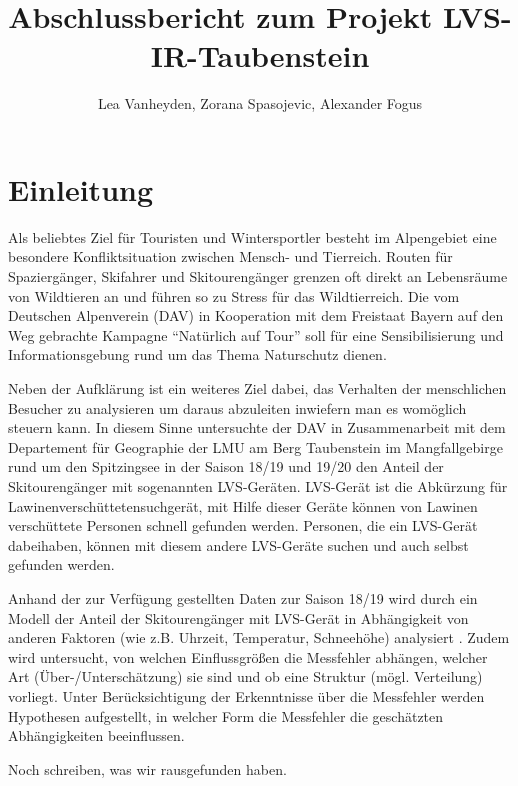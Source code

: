\documentclass[11pt,a4paper]{report}
\title{Abschlussbericht zum Projekt LVS-IR-Taubenstein}
\author{Lea Vanheyden, Zorana Spasojevic, Alexander Fogus}
\begin{document}
	
\maketitle
	
\tableofcontents

\listoffigures

\listoftables

\newpage

\chapter{Einleitung}

Als beliebtes Ziel für Touristen und Wintersportler besteht im Alpengebiet eine besondere Konfliktsituation zwischen Mensch- und Tierreich. Routen für Spaziergänger, Skifahrer und Skitourengänger grenzen oft direkt an Lebensräume von Wildtieren an und führen so zu Stress für das Wildtierreich. Die vom Deutschen Alpenverein (DAV) in Kooperation mit dem Freistaat Bayern auf den Weg gebrachte Kampagne "`Natürlich auf Tour"' soll für eine Sensibilisierung und Informationsgebung rund um das Thema Naturschutz dienen.

Neben der Aufklärung ist ein weiteres Ziel dabei, das Verhalten der menschlichen Besucher zu analysieren um daraus abzuleiten inwiefern man es womöglich steuern kann. In diesem Sinne untersuchte der DAV in Zusammenarbeit mit dem Departement für Geographie der LMU am Berg Taubenstein im Mangfallgebirge rund um den Spitzingsee in der Saison 18/19 und 19/20 den Anteil der Skitourengänger mit sogenannten LVS-Geräten. LVS-Gerät ist die Abkürzung für Lawinenverschüttetensuchgerät, mit Hilfe dieser Geräte können von Lawinen verschüttete Personen schnell gefunden werden. Personen, die ein LVS-Gerät dabeihaben, können mit diesem andere LVS-Geräte suchen und auch selbst gefunden werden.

Anhand der zur Verfügung gestellten Daten zur Saison 18/19 wird durch ein Modell der Anteil der Skitourengänger mit LVS-Gerät in Abhängigkeit von anderen Faktoren (wie z.B. Uhrzeit, Temperatur, Schneehöhe) analysiert .
Zudem wird untersucht, von welchen Einflussgrößen die Messfehler abhängen, welcher Art (Über-/Unterschätzung) sie sind und ob eine Struktur (mögl. Verteilung) vorliegt.
Unter Berücksichtigung der Erkenntnisse über die Messfehler werden Hypothesen aufgestellt, in welcher Form die Messfehler die geschätzten Abhängigkeiten beeinflussen.

Noch schreiben, was wir rausgefunden haben.
\end{document}
